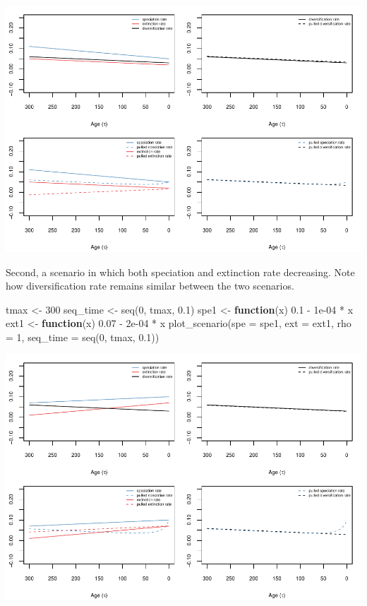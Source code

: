 \documentclass[
]{article}
\newenvironment{Shaded}{\begin{snugshade}}{\end{snugshade}}
\newcommand{\AttributeTok}[1]{\textcolor[rgb]{0.77,0.63,0.00}{#1}}
\newcommand{\ControlFlowTok}[1]{\textcolor[rgb]{0.13,0.29,0.53}{\textbf{#1}}}
\newcommand{\DecValTok}[1]{\textcolor[rgb]{0.00,0.00,0.81}{#1}}
\newcommand{\FloatTok}[1]{\textcolor[rgb]{0.00,0.00,0.81}{#1}}
\newcommand{\FunctionTok}[1]{\textcolor[rgb]{0.00,0.00,0.00}{#1}}
\newcommand{\NormalTok}[1]{#1}
\newcommand{\OtherTok}[1]{\textcolor[rgb]{0.56,0.35,0.01}{#1}}
\newcommand{\SpecialCharTok}[1]{\textcolor[rgb]{0.00,0.00,0.00}{#1}}
\begin{document}
\includegraphics{supplement_files/figure-latex/unnamed-chunk-12-1.pdf}

\pagebreak

Second, a scenario in which both speciation and extinction rate
decreasing. Note how diversification rate remains similar between the
two scenarios.

\begin{Shaded}
\begin{Highlighting}[]
\NormalTok{tmax }\OtherTok{\textless{}{-}} \DecValTok{300}
\NormalTok{seq\_time }\OtherTok{\textless{}{-}} \FunctionTok{seq}\NormalTok{(}\DecValTok{0}\NormalTok{, tmax, }\FloatTok{0.1}\NormalTok{)}
\NormalTok{spe1 }\OtherTok{\textless{}{-}} \ControlFlowTok{function}\NormalTok{(x) }\FloatTok{0.1} \SpecialCharTok{{-}} \FloatTok{1e{-}04} \SpecialCharTok{*}\NormalTok{ x}
\NormalTok{ext1 }\OtherTok{\textless{}{-}} \ControlFlowTok{function}\NormalTok{(x) }\FloatTok{0.07} \SpecialCharTok{{-}} \FloatTok{2e{-}04} \SpecialCharTok{*}\NormalTok{ x}
\FunctionTok{plot\_scenario}\NormalTok{(}\AttributeTok{spe =}\NormalTok{ spe1, }\AttributeTok{ext =}\NormalTok{ ext1, }\AttributeTok{rho =} \DecValTok{1}\NormalTok{, }\AttributeTok{seq\_time =} \FunctionTok{seq}\NormalTok{(}\DecValTok{0}\NormalTok{,}
\NormalTok{    tmax, }\FloatTok{0.1}\NormalTok{))}
\end{Highlighting}
\end{Shaded}

\includegraphics{supplement_files/figure-latex/unnamed-chunk-13-1.pdf}
\end{document}

